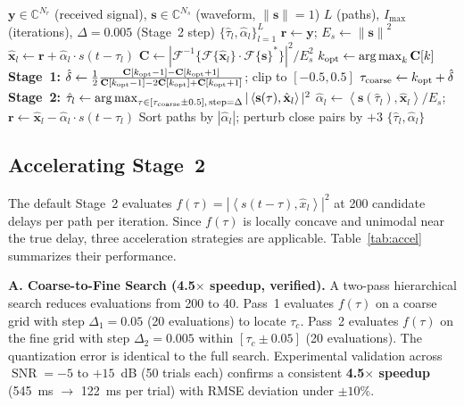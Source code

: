 \documentclass[journal]{IEEEtran}
\DeclareMathOperator*{\argmax}{arg\,max}
\DeclareMathOperator{\SNR}{SNR}
\newcommand{\Fc}{\mathcal{F}}
\newcommand{\Cc}{\mathbb{C}}
\newcommand{\norm}[1]{\left\lVert #1 \right\rVert}
\newcommand{\inner}[2]{\left\langle #1, #2 \right\rangle}
\newcommand{\hb}[1]{\hat{#1}}
\begin{document}
\begin{algorithm}[t]
\caption{Two-Stage CD-SAGE}
\label{alg:sage}
\begin{algorithmic}[1]
\Require $\mathbf{y} \in \Cc^{N_r}$ (received signal), $\mathbf{s} \in \Cc^{N_s}$ (waveform, $\norm{\mathbf{s}}=1$)
\Require $L$ (paths), $I_{\max}$ (iterations), $\Delta=0.005$ (Stage~2 step)
\Ensure $\{\hat{\tau}_l, \hat{\alpha}_l\}_{l=1}^{L}$
\State $\mathbf{r} \gets \mathbf{y}$; $E_s \gets \norm{\mathbf{s}}^2$
    \State $\hat{\mathbf{x}}_l \gets \mathbf{r} + \hat{\alpha}_l \cdot s(t-\hat{\tau}_l)$ 
    \State $\mathbf{C} \gets |\Fc^{-1}\{\Fc\{\hat{\mathbf{x}}_l\} \cdot \Fc\{\mathbf{s}\}^*\}|^2 / E_s^2$ 
    \State $k_{\rm opt} \gets \argmax_{k} \mathbf{C}[k]$ 
    \State \textbf{Stage~1:} $\hat{\delta} \gets \frac{1}{2}\frac{\mathbf{C}[k_{\rm opt}-1] - \mathbf{C}[k_{\rm opt}+1]}{\mathbf{C}[k_{\rm opt}-1] - 2\mathbf{C}[k_{\rm opt}] + \mathbf{C}[k_{\rm opt}+1]}$; clip to $[-0.5,0.5]$
    \State $\tau_{\rm coarse} \gets k_{\rm opt} + \hat{\delta}$
    \State \textbf{Stage~2:} $\hat{\tau}_l \gets \argmax_{\tau \in [\tau_{\rm coarse}\pm0.5],\, \text{step}=\Delta} |\inner{\mathbf{s}(\tau)}{\hat{\mathbf{x}}_l}|^2$
    \State $\hat{\alpha}_l \gets \inner{\mathbf{s}(\hat{\tau}_l)}{\hat{\mathbf{x}}_l} / E_s$; $\mathbf{r} \gets \hat{\mathbf{x}}_l - \hat{\alpha}_l \cdot s(t-\hat{\tau}_l)$
  \EndFor
   \State Sort paths by $|\hat{\alpha}_l|$; perturb close pairs by $+3$ \EndIf
\EndFor
\State \Return $\{\hat{\tau}_l, \hat{\alpha}_l\}$
\end{algorithmic}
\end{algorithm}

\subsection{Accelerating Stage~2}
\label{sec:accelerate}

The default Stage~2 evaluates $f(\tau) = |\inner{s(t-\tau)}{\hb{x}_l}|^2$ at 200 candidate delays per path per iteration. Since $f(\tau)$ is locally concave and unimodal near the true delay, three acceleration strategies are applicable. Table~\ref{tab:accel} summarizes their performance.

\textbf{A. Coarse-to-Fine Search (4.5$\times$ speedup, verified).} A two-pass hierarchical search reduces evaluations from 200 to 40. Pass~1 evaluates $f(\tau)$ on a coarse grid with step $\Delta_1 = 0.05$ (20 evaluations) to locate $\tau_c$. Pass~2 evaluates $f(\tau)$ on the fine grid with step $\Delta_2 = 0.005$ within $[\tau_c \pm 0.05]$ (20 evaluations). The quantization error is identical to the full search. Experimental validation across $\SNR = -5$ to $+15$~dB (50 trials each) confirms a consistent \textbf{4.5$\times$ speedup} (\SI{545}{ms} $\to$ \SI{122}{ms} per trial) with RMSE deviation under $\pm 10\%$.
\end{document}
